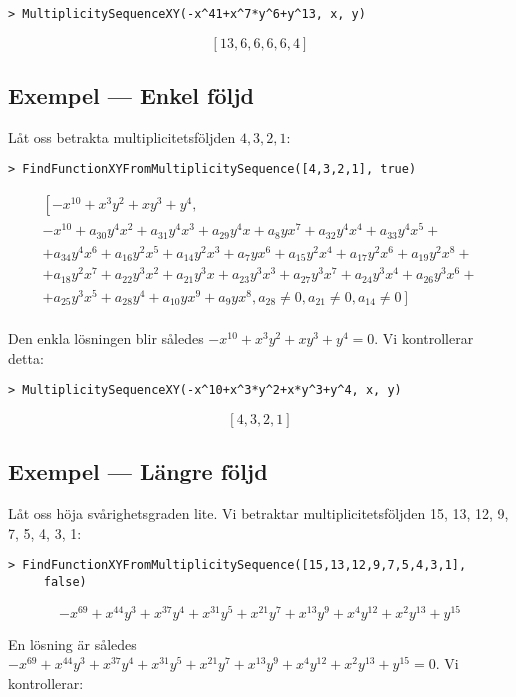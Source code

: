 \begin{verbatim}
> MultiplicitySequenceXY(-x^41+x^7*y^6+y^13, x, y)
\end{verbatim}
\[\left[13, 6, 6, 6, 6, 4\right]\]

\subsection{Exempel --- Enkel följd}

Låt oss betrakta multiplicitetsföljden $4,3,2,1$:

\begin{verbatim}
> FindFunctionXYFromMultiplicitySequence([4,3,2,1], true)
\end{verbatim}
\[
\begin{array}{l}
\left[-x^{10}+x^3y^2+xy^3+y^4,\right.\\ -x^{10}+a_{30}y^4x^2+a_{31}y^4x^3+a_{29}y^4x+a_{8}yx^7+a_{32}y^4x^4+a_{33}y^4x^5+\\
+a_{34}y^4x^6+a_{16}y^2x^5+a_{14}y^2x^3+a_{7}yx^6+a_{15}y^2x^4+a_{17}y^2x^6+a_{19}y^2x^8+\\
+a_{18}y^2x^7+a_{22}y^3x^2+a_{21}y^3x+a_{23}y^3x^3+a_{27}y^3x^7+a_{24}y^3x^4+a_{26}y^3x^6+\\
+a_{25}y^3x^5+a_{28}y^4+a_{10}yx^9+a_{9}yx^8,a_{28} \neq 0,a_{21} \neq 0,\left.a_{14} \neq 0\right]\\
\end{array}\]

Den enkla lösningen blir således $-x^{10}+x^3y^2+xy^3+y^4 = 0$. Vi kontrollerar
detta:

\begin{verbatim}
> MultiplicitySequenceXY(-x^10+x^3*y^2+x*y^3+y^4, x, y)
\end{verbatim}
\[\left[4,3,2,1\right]\]

\subsection{Exempel --- Längre följd}

Låt oss höja svårighetsgraden lite. Vi betraktar multiplicitetsföljden 15, 13, 12, 9, 7, 5, 4, 3, 1:

\begin{verbatim}
> FindFunctionXYFromMultiplicitySequence([15,13,12,9,7,5,4,3,1], 
     false)
\end{verbatim}
\[-x^{69}+x^{44}y^3+x^{37}y^4+x^{31}y^5+x^{21}y^7+x^{13}y^9+x^4y^{12}+x^2y^{13}+y^{15}\]

En lösning är således $-x^{69}+x^{44}y^3+x^{37}y^4+x^{31}y^5+x^{21}y^7+x^{13}y^9+x^4y^{12}+x^2y^{13}+y^{15} = 0$. Vi kontrollerar:

